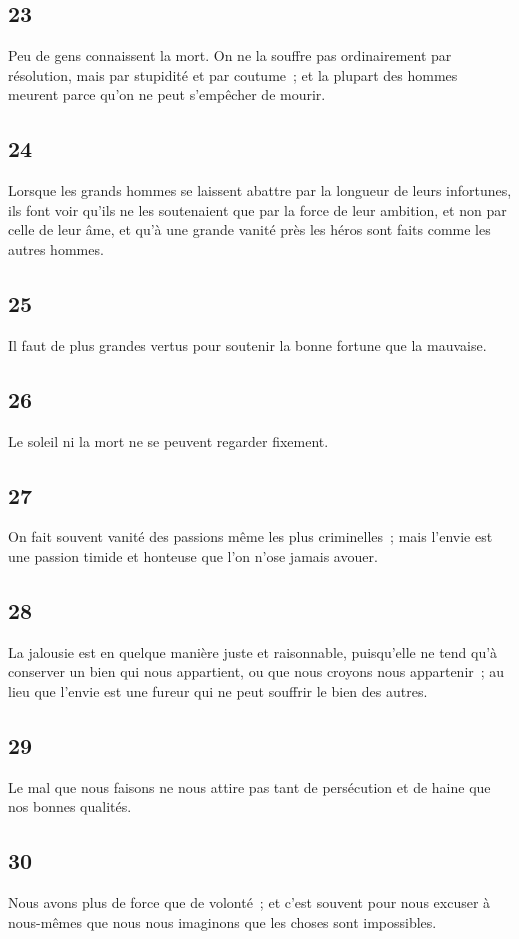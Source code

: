 \documentclass[french,twoside]{book} %
\begin{document}
\subsection[{23}]{ \textsc{23} }
\noindent Peu de gens connaissent la mort. On ne la souffre pas ordinairement par résolution, mais par stupidité et par coutume ; et la plupart des hommes meurent parce qu’on ne peut s’empêcher de mourir.
\subsection[{24}]{ \textsc{24} }
\noindent Lorsque les grands hommes se laissent abattre par la longueur de leurs infortunes, ils font voir qu’ils ne les soutenaient que par la force de leur ambition, et non par celle de leur âme, et qu’à une grande vanité près les héros sont faits comme les autres hommes.
\subsection[{25}]{ \textsc{25} }
\noindent Il faut de plus grandes vertus pour soutenir la bonne fortune que la mauvaise.
\subsection[{26}]{ \textsc{26} }
\noindent Le soleil ni la mort ne se peuvent regarder fixement.
\subsection[{27}]{ \textsc{27} }
\noindent On fait souvent vanité des passions même les plus criminelles ; mais l’envie est une passion timide et honteuse que l’on n’ose jamais avouer.
\subsection[{28}]{ \textsc{28} }
\noindent La jalousie est en quelque manière juste et raisonnable, puisqu’elle ne tend qu’à conserver un bien qui nous appartient, ou que nous croyons nous appartenir ; au lieu que l’envie est une fureur qui ne peut souffrir le bien des autres.
\subsection[{29}]{ \textsc{29} }
\noindent Le mal que nous faisons ne nous attire pas tant de persécution et de haine que nos bonnes qualités.
\subsection[{30}]{ \textsc{30} }
\noindent Nous avons plus de force que de volonté ; et c’est souvent pour nous excuser à nous-mêmes que nous nous imaginons que les choses sont impossibles.
\end{document}
